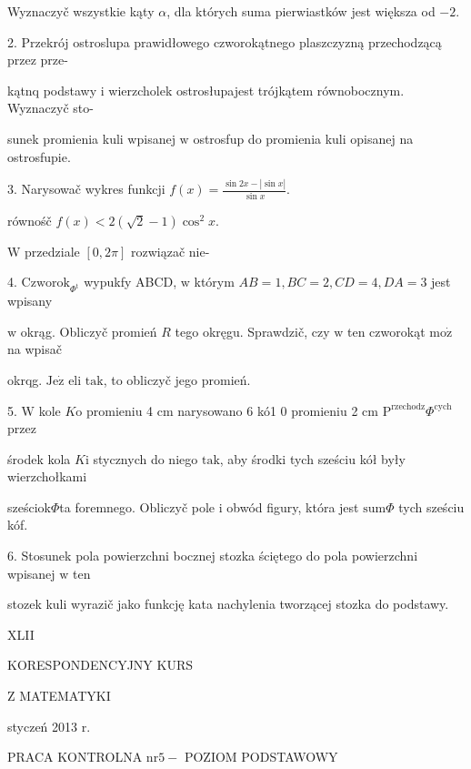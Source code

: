 \documentclass[a4paper,12pt]{article}
\begin{document}
Wyznaczyč wszystkie kąty $\alpha$, dla których suma pierwiastków jest większa od $-2.$

2. Przekrój ostroslupa prawidłowego czworokątnego plaszczyzną przechodzącą przez prze-

kątnq podstawy $\mathrm{i}$ wierzcholek ostrosłupajest trójkątem równobocznym. Wyznaczyč sto-

sunek promienia kuli wpisanej $\mathrm{w}$ ostrosfup do promienia kuli opisanej na ostrosfupie.

3. Narysowač wykres funkcji $f(x)=\displaystyle \frac{\sin 2x-|\sin x|}{\sin x}.$

równośč $f(x)<2(\sqrt{2}-1)\cos^{2}x.$

$\mathrm{W}$ przedziale $[0,2\pi]$ rozwiązač nie-

4. $\mathrm{C}\mathrm{z}\mathrm{w}\mathrm{o}\mathrm{r}\mathrm{o}\mathrm{k}_{\Phi^{\mathrm{t}}}$ wypukfy ABCD, $\mathrm{w}$ którym $AB=1, BC=2, CD=4, DA=3$ jest wpisany

$\mathrm{w}$ okrąg. Obliczyč promień $R$ tego okręgu. Sprawdzič, czy $\mathrm{w}$ ten czworokąt $\mathrm{m}\mathrm{o}\dot{\mathrm{z}}$ na wpisač

okrqg. $\mathrm{J}\mathrm{e}\dot{\mathrm{z}}$ eli $\mathrm{t}\mathrm{a}\mathrm{k}$, to obliczyč jego promień.

5. $\mathrm{W}$ kole $K\mathrm{o}$ promieniu 4 cm narysowano 6 kó1 $0$ promieniu 2 cm $\mathrm{P}^{\mathrm{r}\mathrm{z}\mathrm{e}\mathrm{c}\mathrm{h}\mathrm{o}\mathrm{d}\mathrm{z}}\Phi^{\mathrm{c}\mathrm{y}\mathrm{c}\mathrm{h}}$ przez

środek kola $K\mathrm{i}$ stycznych do niego $\mathrm{t}\mathrm{a}\mathrm{k}$, aby środki tych sześciu kół były wierzchołkami

sześciok$\Phi$ta foremnego. Obliczyč pole $\mathrm{i}$ obwód figury, która jest $\mathrm{s}\mathrm{u}\mathrm{m}\Phi$ tych sześciu kóf.

6. Stosunek pola powierzchni bocznej stozka ściętego do pola powierzchni wpisanej $\mathrm{w}$ ten

stozek kuli wyrazič jako funkcję kata nachylenia tworzącej stozka do podstawy.





XLII

KORESPONDENCYJNY KURS

Z MATEMATYKI

styczeń 2013 r.

PRACA KONTROLNA $\mathrm{n}\mathrm{r} 5-$ POZIOM PODSTAWOWY
\end{document}
